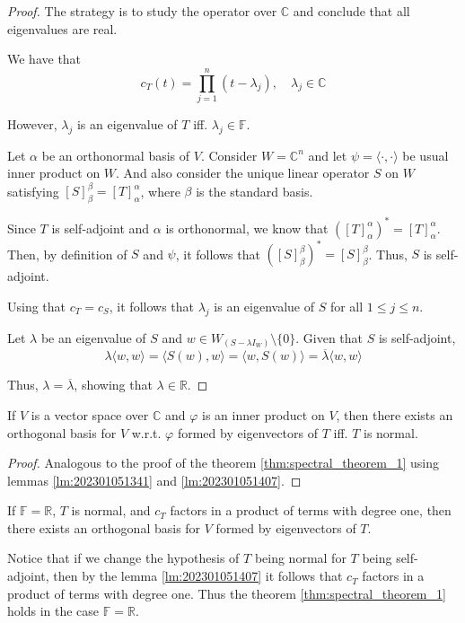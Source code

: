 \begin{proof}
  The strategy is to study the operator over $\mathbb{C}$ and conclude that all eigenvalues are real.

  We have that 
  \[
    c_T(t) = \prod_{j=1}^n (t - \lambda_j), \quad \lambda_j \in \mathbb{C}
  \]

  However, $\lambda_j$ is an eigenvalue of $T$ iff. $\lambda_j \in \mathbb{F}$. 

  Let $\alpha$ be an orthonormal basis of $V$. Consider $W = \mathbb{C}^n$ and let $\psi = \langle \cdot, \cdot \rangle$ be usual inner product on $W$. And also consider the unique linear operator $S$ on $W$ satisfying $[S]_\beta^\beta = [T]_\alpha^\alpha$, where $\beta$ is the standard basis. 

  Since $T$ is self-adjoint and $\alpha$ is orthonormal, we know that $([T]_\alpha^\alpha)^\ast = [T]_\alpha^\alpha$. Then, by definition of $S$ and $\psi$, it follows that $([S]_\beta^\beta)^\ast = [S]_\beta^\beta$. Thus, $S$ is self-adjoint. 

  Using that $c_T = c_S$, it follows that $\lambda_j$ is an eigenvalue of $S$ for all $1 \leq j \leq n$. 

  Let $\lambda$ be an eigenvalue of $S$ and $w \in W_{(S - \lambda I_W)} \setminus \{ 0 \}$. Given that $S$ is self-adjoint, 
  \[
    \lambda \langle w, w \rangle = \langle S(w), w \rangle = \langle w, S(w) \rangle = \overline{\lambda} \langle w, w \rangle 
  \]

  Thus, $\lambda = \overline{\lambda}$, showing that $\lambda \in \mathbb{R}$.
\end{proof}

\begin{theorem}\label{thm:spectral_theorem_2}
  If $V$ is a vector space over $\mathbb{C}$ and $\varphi$ is an inner product on $V$, then there exists an orthogonal basis for $V$ w.r.t. $\varphi$ formed by eigenvectors of $T$ iff. $T$ is normal. 
\end{theorem}

\begin{proof}
  Analogous to the proof of the theorem \ref{thm:spectral_theorem_1} using lemmas \ref{lm:202301051341} and \ref{lm:202301051407}.
\end{proof}

\begin{corollary}
  If $\mathbb{F} = \mathbb{R}$, $T$ is normal, and $c_T$ factors in a product of terms with degree one, then there exists an orthogonal basis for $V$ formed by eigenvectors of $T$.
\end{corollary}

Notice that if we change the hypothesis of $T$ being normal for $T$ being self-adjoint, then by the lemma \ref{lm:202301051407} it follows that $c_T$ factors in a product of terms with degree one. Thus the theorem \ref{thm:spectral_theorem_1} holds in the case $\mathbb{F} = \mathbb{R}$. 
